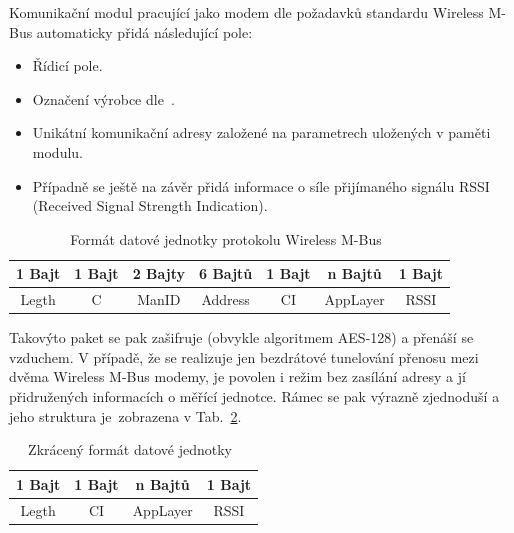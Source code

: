 Komunikační modul pracující jako modem dle požadavků standardu Wireless M-Bus automaticky přidá následující pole:

\begin{itemize}
	\item Řídicí pole.
\item Označení výrobce dle~\cite{WmbusVendors}.
\item Unikátní komunikační adresy založené na parametrech uložených v paměti modulu.
\item Případně se ještě na závěr přidá informace o síle přijímaného signálu RSSI (Received Signal Strength Indication).
\end{itemize}



\begin{table}[!ht]
\centering
\begin{tabular}{ccccccc}
1 Bajt & 1 Bajt & 2 Bajty & 6 Bajtů & 1 Bajt & n Bajtů & 1 Bajt \\ \hline
\multicolumn{1}{|c|}{Legth} & \multicolumn{1}{c|}{C} & \multicolumn{1}{c|}{ManID} & \multicolumn{1}{c|}{Address} & \multicolumn{1}{c|}{CI} & \multicolumn{1}{c|}{AppLayer} & \multicolumn{1}{c|}{RSSI} \\ \hline
\end{tabular}
\caption{Formát datové jednotky protokolu Wireless M-Bus~\cite{FormatDatoveJednotky}}
\label{PaketWm2}
\vspace{-5pt}
\end{table}

Takovýto paket se pak zašifruje (obvykle algoritmem AES-128) a přenáší se vzduchem. V případě, že se realizuje jen bezdrátové tunelování přenosu mezi dvěma Wireless M-Bus modemy, je povolen i režim bez zasílání adresy a jí přidružených informacích o měřící jednotce. Rámec se pak výrazně zjednoduší a jeho struktura je~zobrazena v Tab.~\ref{PaketWm3}.

			
			\begin{table}[!ht]
			\vspace{-10pt}
\centering
\begin{tabular}{cccc}
1 Bajt & 1 Bajt & n Bajtů & 1 Bajt \\ \hline
\multicolumn{1}{|c|}{Legth} & \multicolumn{1}{c|}{CI} & \multicolumn{1}{c|}{AppLayer} & \multicolumn{1}{c|}{RSSI} \\ \hline
\end{tabular}
\caption{Zkrácený formát datové jednotky~\cite{FormatDatoveJednotky}}
\label{PaketWm3}
\vspace{-20pt}
\end{table}
			
